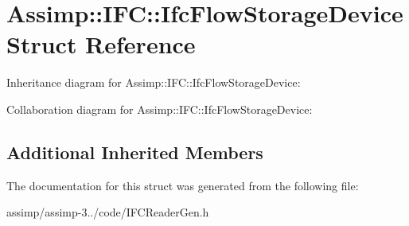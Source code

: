 \hypertarget{struct_assimp_1_1_i_f_c_1_1_ifc_flow_storage_device}{\section{Assimp\+:\+:I\+F\+C\+:\+:Ifc\+Flow\+Storage\+Device Struct Reference}
\label{struct_assimp_1_1_i_f_c_1_1_ifc_flow_storage_device}
}


Inheritance diagram for Assimp\+:\+:I\+F\+C\+:\+:Ifc\+Flow\+Storage\+Device\+:


Collaboration diagram for Assimp\+:\+:I\+F\+C\+:\+:Ifc\+Flow\+Storage\+Device\+:
\subsection*{Additional Inherited Members}


The documentation for this struct was generated from the following file\+:\begin{DoxyCompactItemize}
\item 
assimp/assimp-\/3../code/I\+F\+C\+Reader\+Gen.\+h\end{DoxyCompactItemize}
